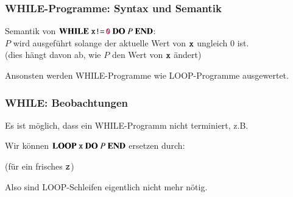 \documentclass[onlymath]{beamer}
\begin{document}
\begin{frame}\frametitle{WHILE-Programme: Syntax und Semantik}

\bigskip\pause

Semantik von $\textbf{WHILE}~\texttt{x}\texttt{!=}\,\texttt{\textcolor{purple}{0}}~\textbf{DO}~P~\textbf{END}{}$:\\
$P$ wird ausgeführt solange der aktuelle Wert von $\texttt{x}$ ungleich $0$ ist.\\
\textcolor{devilscss}{(dies hängt davon ab, wie $P$ den Wert von $\texttt{x}$ ändert)}
\medskip

Ansonsten werden WHILE-Programme wie LOOP-Programme ausgewertet.

\end{frame}

\begin{frame}\frametitle{WHILE: Beobachtungen}

Es ist möglich, dass ein WHILE-Programm nicht terminiert, z.B.\medskip

\bigskip
\pause

Wir können $\textbf{LOOP}~\texttt{x}~\textbf{DO}~P~\textbf{END}{}$
ersetzen durch:\medskip


(für ein frisches $\texttt{z}$)\bigskip

Also sind LOOP-Schleifen eigentlich nicht mehr nötig.

\end{frame}
\end{document}
